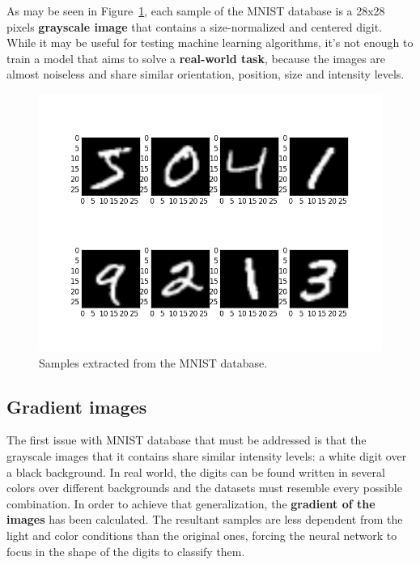 As may be seen in Figure~\ref{fig:mnist}, each sample of the MNIST database is a 28x28 pixels \textbf{grayscale image} that contains a size-normalized and centered digit. While it may be useful for testing machine learning algorithms, it's not enough to train a model that aims to solve a \textbf{real-world task}, because the images are almost noiseless and share similar orientation, position, size and intensity levels.
\begin{figure}
	\centering
	\includegraphics[width=12cm, keepaspectratio]{figures/mnist.png}
	\caption{Samples extracted from the MNIST database.}
	\label{fig:mnist}
\end{figure}

\subsection{Gradient images}\label{subsec:edge}
The first issue with MNIST database that must be addressed is that the grayscale images that it contains share similar intensity levels: a white digit over a black background. In real world, the digits can be found written in several colors over different backgrounds and the datasets must resemble every possible combination. In order to achieve that generalization, the \textbf{gradient of the images} has been calculated. The resultant samples are less dependent from the light and color conditions than the original ones, forcing the neural network to focus in the shape of the digits to classify them.

